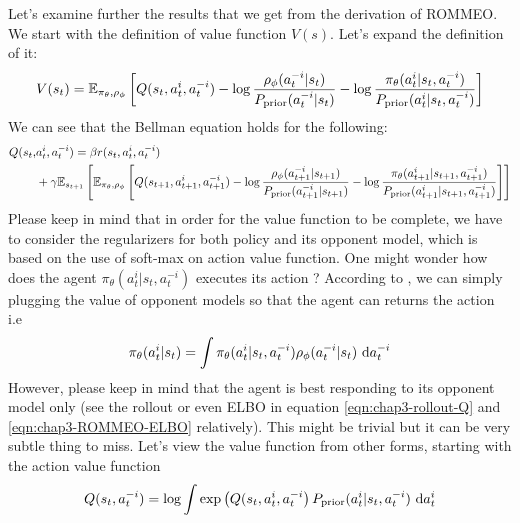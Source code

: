 Let's examine further the results that we get from the derivation of ROMMEO. We start with the definition of value function $V(s)$. Let's expand the definition of it:
\begin{equation}
    V(s_{t}) =\mathbb{E}_{\pi_\theta, \rho_\phi}\left[ Q(s_t, a^i_t, a^{-i}_t) - \log\frac{\rho_\phi(a^{-i}_t | s_t)}{P_{\text{prior}}(a^{-i}_t | s_t)} - \log\frac{\pi_{\theta}(a^i_t | s_t, a^{-i}_t) }{P_{\text{prior}}(a^i_t | s_t, a^{-i}_t)} \right]
\end{equation}
We can see that the Bellman equation holds for the following:
\begin{equation}
\begin{aligned}
\label{eqn:chap3-rollout-Q}
    Q(s_{t},& a^i_{t}, a^{-i}_{t}) = \beta r(s_t, a^i_t, a^{-i}_t) \\
    &+ \gamma\mathbb{E}_{s_{t+1}}\left[ \mathbb{E}_{\pi_\theta, \rho_\phi}\left[ Q(s_{t+1}, a^i_{t+1}, a^{-i}_{t+1}) - \log\frac{\rho_\phi(a^{-i}_{t+1} | s_{t+1})}{P_{\text{prior}}(a^{-i}_{t+1} | s_{t+1})} - \log\frac{\pi_{\theta}(a^i_{t+1} | s_{t+1}, a^{-i}_{t+1}) }{P_{\text{prior}}(a^i_{t+1} | s_{t+1}, a^{-i}_{t+1})} \right] \right]
\end{aligned}
\end{equation}
Please keep in mind that in order for the value function to be complete, we have to consider the regularizers for both policy and its opponent model, which is based on the use of soft-max on action value function. One might wonder how does the agent $\pi_\theta(a^i_t | s_t, a^{-i}_t)$ executes its action ? According to \cite{tian2019regularized}, we can simply plugging the value of opponent models so that the agent can returns the action i.e 
\begin{equation}
\label{eqn:chap3-ROMMEO-execute-action}
\pi_\theta(a^i_t |s_t) = \int \pi_\theta(a^i_t | s_t, a^{-i}_t) \rho_\phi(a^{-i}_t | s_t) \ \mathrm{d} a^{-i}_t 
\end{equation}
However, please keep in mind that the agent is best responding to its opponent model only (see the rollout or even ELBO in equation \ref{eqn:chap3-rollout-Q} and \ref{eqn:chap3-ROMMEO-ELBO} relatively). This might be trivial but it can be very subtle thing to miss. 
Let's view the value function from other forms, starting with the action value function 
\begin{equation}
    Q(s_t, a^{-i}_t) = \log \int \exp \left( Q(s_t, a^i_t, a^{-i}_t \right)P_{\text{prior}}(a^i_t | s_t, a^{-i}_t)  \ \mathrm{d} a^i_t 
\end{equation}
